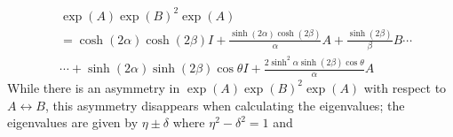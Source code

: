 \documentclass[notitlepage]{article}
\begin{document}
\begin{align}
    &\exp(A)\exp(B)^2\exp(A)\\
    &= \cosh(2 \alpha) \cosh(2 \beta) I + \frac{\sinh (2\alpha) \cosh (2\beta)}{\alpha} A + \frac{\sinh(2\beta)}{\beta} B\cdots\\
    &\cdots+\sinh (2\alpha) \sinh (2\beta)\cos \theta I+ \frac{2\sinh^2 \alpha \sinh (2\beta) \cos \theta}{\alpha}A
\end{align}
While there is an asymmetry in $\exp(A)\exp(B)^2\exp(A)$ with respect to $A \leftrightarrow B$, this asymmetry disappears when calculating the eigenvalues; the eigenvalues are given by $\eta\pm\delta$ where $\eta^2 - \delta^2 = 1$ and
\end{document}
